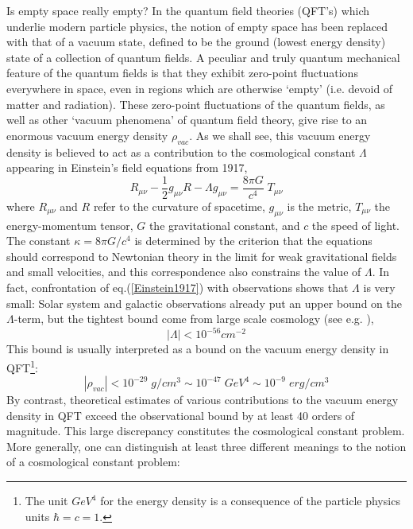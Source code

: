 \documentclass[12pt]{article}
\newcommand{\beq}{\begin{equation}}
\newcommand{\eeq}{\end{equation}}
\begin{document}
Is empty space really empty?  In the quantum field theories (QFT's)
which underlie modern particle physics, the notion of empty space has
been replaced with that of a vacuum state, defined to be the ground
(lowest energy density) state of a collection of quantum fields.  A
peculiar and truly quantum mechanical feature of the quantum fields is
that they exhibit zero-point fluctuations everywhere in space, even in
regions which are otherwise `empty' (i.e. devoid of matter and
radiation). These zero-point fluctuations of the quantum fields, as
well as other `vacuum phenomena' of quantum field theory, give rise to
an enormous vacuum energy density $\rho_{vac}$. As we shall see, this
vacuum energy density is believed to act as a contribution to the
cosmological constant $\Lambda$ appearing in Einstein's field
equations from 1917,
\begin{equation}
\label{Einstein1917} R_{\mu \nu} - \frac{1}{2} g_{\mu \nu} R -
\Lambda g_{\mu \nu} = \frac{8 \pi G}{c^4} \; T_{\mu \nu}
\end{equation}
where $R_{\mu \nu}$ and $R$ refer to the curvature of spacetime,
$g_{\mu \nu}$ is the metric, 
$T_{\mu \nu}$ the energy-momentum 
tensor, $G$ the gravitational constant, and $c$ the speed of light.
The constant $\kappa = 8\pi G/c^4$ is determined by the criterion
that the equations should correspond to Newtonian theory in the limit
for weak gravitational fields and small velocities, and this
correspondence also constrains the value of $\Lambda$.
In fact, confrontation of eq.(\ref{Einstein1917}) with observations 
shows that $\Lambda$ is very small: Solar system and galactic 
observations already put an upper bound on the
$\Lambda$-term, but the tightest bound come from large scale cosmology
(see e.g. \cite{Carrolletal92}), 
\beq
|\Lambda| < 10^{-56} cm^{-2}
\eeq
This bound is usually interpreted as a bound on the vacuum energy 
density in QFT\footnote{The unit $GeV^4$ for the
energy density is a consequence of the particle physics units
$\hbar=c=1$.}: 
\beq 
| \rho_{vac} | < 10^{-29} \; g/cm^3 \sim 10^{-47} \; GeV^4 \sim 10^{-9}
\; erg/cm^3
\label{obsbound}
\eeq
By contrast, theoretical estimates of various contributions to
the vacuum energy density in QFT exceed the observational bound
by at least 40 orders of magnitude. This large discrepancy
constitutes the cosmological constant problem. More generally, one can
distinguish at least three different meanings to the notion of a
cosmological constant problem:\\ 
\end{document}
